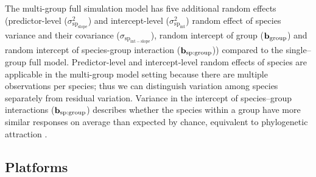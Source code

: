 \documentclass[12pt]{article}
\begin{document}
The multi-group full simulation model has five additional random effects (predictor-level ($\sigma^2_{\mathrm{sp_{slope}}}$) and intercept-level ($\sigma^2_{\mathrm{sp_{int}}}$) random effect of species variance and their covariance ($\sigma_{\mathrm{sp_{int-slope}}}$), random intercept of group ($\bf{b_{\mathrm{group}}}$) and random intercept of species-group interaction ($\bf{b_{\mathrm{sp:group}}}$)) compared to the single--group full model.
Predictor-level and intercept-level random effects of species are applicable in the multi-group model setting because there are multiple observations per species; thus we can distinguish variation among species separately from residual variation.
Variance in the intercept of species--group interactions ($\bf{b_{\mathrm{sp:group}}}$) describes whether the species within a group have more similar responses on average than expected by chance, equivalent to phylogenetic attraction \citep{helmus2007separating}. 

\subsection*{Platforms}
\end{document}
